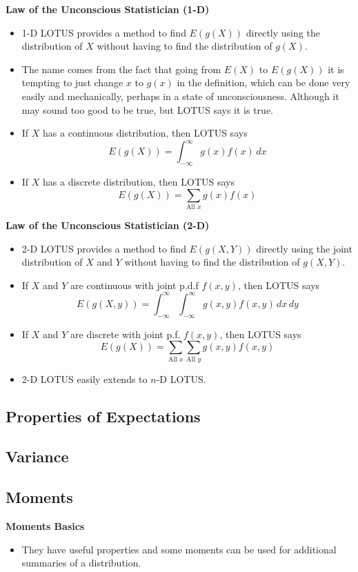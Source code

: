 \documentclass[11pt]{article}
\begin{document}
\textbf{Law of the Unconscious Statistician (1-D)}
\begin{itemize}
    \item 1-D LOTUS provides a method to find $E(g(X))$ directly using the distribution of $X$ 
    without having to find the distribution of $g(X)$.
    \item The name comes from the fact that going from $E(X)$ to $E(g(X))$ it is tempting to 
    just change $x$ to $g(x)$ in the definition, which can be done very easily and 
    mechanically, perhaps in a state of unconsciousness. Although it may sound too good to be 
    true, but LOTUS says it is true. 
    \item If $X$ has a continuous distribution, then LOTUS says
    \[E(g(X)) = \int_{-\infty}^{\infty} g(x) f(x) \,dx\]
    \item If $X$ has a discrete distribution, then LOTUS says
    \[E(g(X)) = \sum_{\text{All } x} g(x) f(x)\]
\end{itemize}

\textbf{Law of the Unconscious Statistician (2-D)}
\begin{itemize}
    \item 2-D LOTUS provides a method to find $E(g(X,Y))$ directly using the joint 
    distribution of $X$ and $Y$ without having to find the distribution of $g(X,Y)$.
    \item If $X$ and $Y$ are continuous with joint p.d.f $f(x,y)$, then LOTUS says
    \[E(g(X,y)) = \int_{-\infty}^{\infty} \int_{-\infty}^{\infty} g(x,y) f(x,y) \,dx \,dy\]
    \item If $X$ and $Y$ are discrete with joint p.f. $f(x,y)$, then LOTUS says
    \[E(g(X)) = \sum_{\text{All } x} \sum_{\text{All } y} g(x,y) f(x,y)\]
    \item 2-D LOTUS easily extends to $n$-D LOTUS.
\end{itemize}

\subsection{Properties of Expectations}
\subsection{Variance}
\subsection{Moments}
\textbf{Moments Basics}
\begin{itemize}
    \item They have useful properties and some moments can be used for additional summaries of 
    a distribution. 
\end{itemize}
\end{document}

